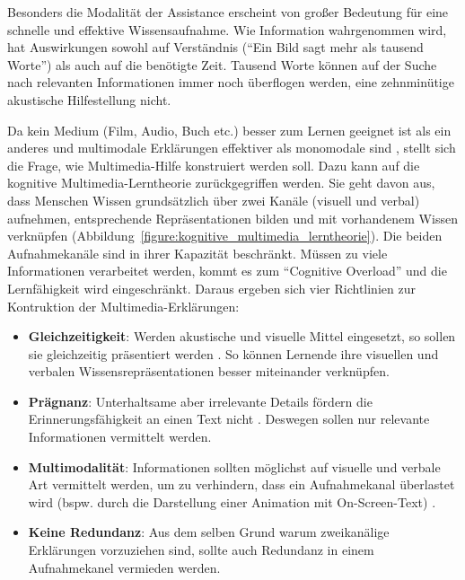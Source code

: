 \documentclass[
	headsepline,
	footsepline,
	fontsize=12pt,
	bibliography=totoc
]{scrbook}
\begin{document}
Besonders die Modalität der Assistance erscheint von großer Bedeutung für eine schnelle und effektive Wissensaufnahme. Wie Information wahrgenommen wird, hat Auswirkungen sowohl auf Verständnis (\enquote{Ein Bild sagt mehr als tausend Worte}) als auch auf die benötigte Zeit. Tausend Worte können auf der Suche nach relevanten Informationen immer noch überflogen werden, eine zehnminütige akustische Hilfestellung nicht.


Da kein Medium (Film, Audio, Buch etc.) besser zum Lernen geeignet ist als ein anderes \cite{Clark1994, Kozma1994} und multimodale Erklärungen effektiver als monomodale sind \cite{Mayer2002}, stellt sich die Frage, wie Multimedia-Hilfe konstruiert werden soll. Dazu kann auf die kognitive Multimedia-Lerntheorie zurückgegriffen werden. Sie geht davon aus, dass Menschen Wissen grundsätzlich über zwei Kanäle (visuell und verbal) aufnehmen, entsprechende Repräsentationen bilden und mit vorhandenem Wissen verknüpfen (Abbildung~\ref{figure:kognitive_multimedia_lerntheorie}). Die beiden Aufnahmekanäle sind in ihrer Kapazität beschränkt. Müssen zu viele Informationen verarbeitet werden, kommt es zum \enquote{Cognitive Overload} und die Lernfähigkeit wird eingeschränkt. Daraus ergeben sich vier Richtlinien zur Kontruktion der Multimedia-Erklärungen:

\begin{itemize}
	\item \textbf{Gleichzeitigkeit}: Werden akustische und visuelle Mittel eingesetzt, so sollen sie gleichzeitig präsentiert werden \cite{Mayer1991}. So können Lernende ihre visuellen und verbalen Wissensrepräsentationen besser miteinander verknüpfen.
	\item \textbf{Prägnanz}: Unterhaltsame aber irrelevante Details fördern die Erinnerungsfähigkeit an einen Text nicht \cite{Garner1989}. Deswegen sollen nur relevante Informationen vermittelt werden.
	\item \textbf{Multimodalität}: Informationen sollten möglichst auf visuelle und verbale Art vermittelt werden, um zu verhindern, dass ein Aufnahmekanal überlastet wird (bspw. durch die Darstellung einer Animation mit On-Screen-Text) \cite{Moreno1999}.
	\item \textbf{Keine Redundanz}: Aus dem selben Grund warum zweikanälige Erklärungen vorzuziehen sind, sollte auch Redundanz in einem Aufnahmekanel vermieden werden.
\end{itemize}
\end{document}
